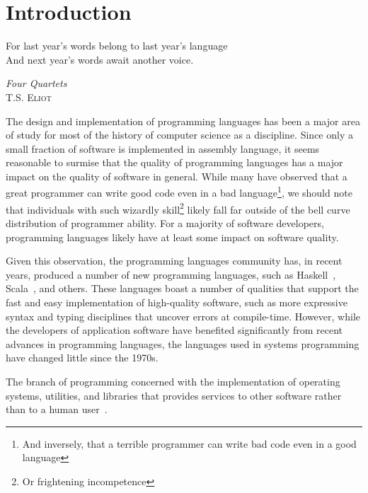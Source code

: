 %
%

\chapter{Introduction}\label{ch:intro} %

\epigraph{ For last year's words belong to last year's language \\
           And next year's words await another voice. }%
         { \textit{Four Quartets} \\ \textsc{T.S. Eliot} }

The design and implementation of programming languages has been a major area of study for most of the history of computer science as a discipline. Since only a small fraction of software is implemented in assembly language, it seems reasonable to surmise that the quality of programming languages has a major impact on the quality of software in general. While many have observed that a great programmer can write good code even in a bad language\footnote{And inversely, that a terrible programmer can write bad code even in a good language}, we should note that individuals with such wizardly skill\footnote{Or frightening incompetence} likely fall far outside of the bell curve distribution of programmer ability. For a majority of software developers, programming languages likely have at least some impact on software quality.

Given this observation, the programming languages community has, in recent years, produced a number of new programming languages, such as Haskell~\cite{jones2003haskell,hudak1992report}, Scala~\cite{odersky2004scala,odersky2004overview}, and others. These languages boast a number of qualities that support the fast and easy implementation of high-quality software, such as more expressive syntax and typing disciplines that uncover errors at compile-time. However, while the developers of application software have benefited significantly from recent advances in programming languages, the languages used in systems programming have changed little since the 1970s.

\begin{defn}
The branch of programming concerned with the implementation of operating systems, utilities, and libraries that provides services to other software rather than to a human user~\cite{Narten:2003:SP:1074100.1074850}.
\end{defn}

